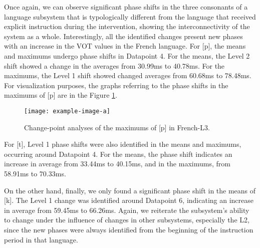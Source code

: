 Once again, we can observe significant phase shifts in the three consonants of
a language subsystem that is typologically different from the language that
received explicit instruction during the intervention, showing the
interconnectivity of the system as a whole. Interestingly, all the identified
changes present new phases with an increase in the VOT values in the French
language. For [p], the means and maximums undergo phase shifts in Datapoint 4.
For the means, the Level 2 shift showed a change in the averages from 30.99ms
to 40.78ms. For the maximums, the Level 1 shift  showed changed averages from
60.68ms to 78.48ms. For visualization purposes, the graphs referring to the
phase shifts in the maximums of [p] are in the Figure \ref{laura-fig06}.

\begin{figure}[h]
\centering
\texttt{[image: example-image-a]}
\caption{Change-point analyses of the maximums of [p] in French-L3.}
\label{laura-fig06}
\end{figure}

For [t], Level 1 phase shifts were also identified in the means and maximums,
occurring around Datapoint 4. For the means, the phase shift indicates an
increase in average from 33.44ms to 40.15ms, and in the maximums, from 58.91ms
to 70.33ms.

On the other hand, finally, we only found a significant phase shift in the
means of [k]. The Level 1 change was identified around Datapoint 6, indicating
an increase in average from 59.45ms to 66.26ms. Again, we reiterate the
subsystem's ability to change under the influence of changes in other
subsystems, especially the L2, since the new phases were always identified from
the beginning of the instruction period in that language.


